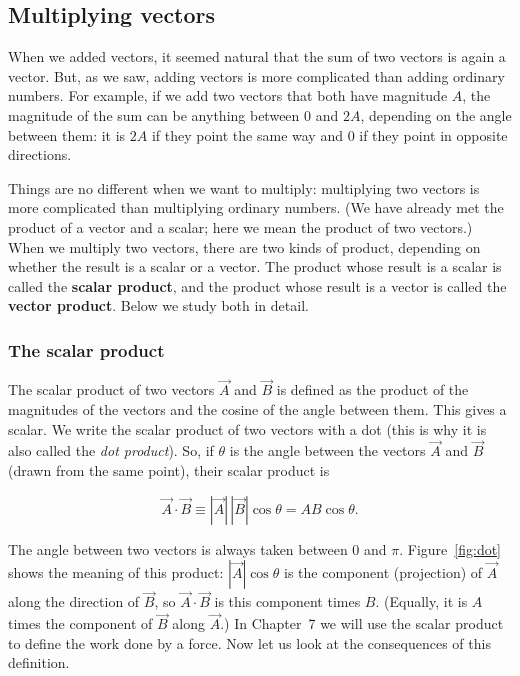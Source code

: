 \documentclass[11pt,a4paper]{article}
\begin{document}
\subsection{Multiplying vectors}

When we added vectors, it seemed natural that the sum of two vectors is again a vector. But, as we
saw, adding vectors is more complicated than adding ordinary numbers. For example, if we add two
vectors that both have magnitude $A$, the magnitude of the sum can be anything between $0$ and
$2A$, depending on the angle between them: it is $2A$ if they point the same way and $0$ if they
point in opposite directions.

Things are no different when we want to multiply: multiplying two vectors is more complicated than
multiplying ordinary numbers. (We have already met the product of a vector and a scalar; here we
mean the product of two vectors.) When we multiply two vectors, there are two kinds of product,
depending on whether the result is a scalar or a vector. The product whose result is a scalar is
called the \textbf{scalar product}, and the product whose result is a vector is called the
\textbf{vector product}. Below we study both in detail.

\subsubsection{The scalar product}

The scalar product of two vectors $\vec{A}$ and $\vec{B}$ is defined as the product of the
magnitudes of the vectors and the cosine of the angle between them. This gives a scalar. We write
the scalar product of two vectors with a dot (this is why it is also called the \emph{dot
product}). So, if $\theta$ is the angle between the vectors $\vec{A}$ and $\vec{B}$ (drawn from the
same point), their scalar product is
\begin{keyresult}
\begin{equation}\label{eq:dot}
  \vec{A}\cdot\vec{B} \equiv |\vec{A}|\,|\vec{B}|\cos\theta = AB\cos\theta .
\end{equation}
\end{keyresult}
The angle between two vectors is always taken between $0$ and $\pi$. Figure~\ref{fig:dot} shows
the meaning of this product: $|\vec{A}|\cos\theta$ is the component (projection) of $\vec{A}$
along the direction of $\vec{B}$, so $\vec{A}\cdot\vec{B}$ is this component times $B$. (Equally,
it is $A$ times the component of $\vec{B}$ along $\vec{A}$.) In Chapter~7 we will use the scalar
product to define the work done by a force. Now let us look at the consequences of this
definition.
\end{document}
